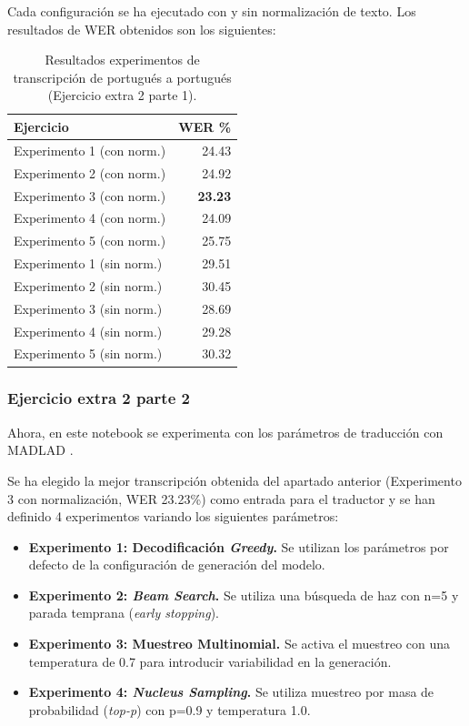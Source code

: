 \documentclass[11pt,spanish,listoffigures,listoftables]{tfgetsinf}
\begin{document}
Cada configuración se ha ejecutado con y sin normalización de texto. Los resultados de WER obtenidos son los siguientes:

\begin{table}[H]
\centering
\begin{tabular}{lr}
	\toprule
	\textbf{Ejercicio}  & \textbf{WER \%} \\
	\midrule
	Experimento 1 (con norm.) & 24.43 \\
	Experimento 2 (con norm.) & 24.92 \\
	Experimento 3 (con norm.) & \textbf{23.23} \\
	Experimento 4 (con norm.) & 24.09 \\
	Experimento 5 (con norm.) & 25.75 \\
	Experimento 1 (sin norm.) & 29.51 \\
	Experimento 2 (sin norm.) & 30.45 \\
	Experimento 3 (sin norm.) & 28.69 \\
	Experimento 4 (sin norm.) & 29.28 \\
	Experimento 5 (sin norm.) & 30.32 \\
	\bottomrule
\end{tabular}
\caption{Resultados experimentos de transcripción de portugués a portugués (Ejercicio extra 2 parte 1).}
\label{tab:wer_extra2_1}
\end{table}

\subsubsection{Ejercicio extra 2 parte 2}
Ahora, en este notebook se experimenta con los parámetros de traducción con MADLAD \cite{kudugunta2023madlad}.

Se ha elegido la mejor transcripción obtenida del apartado anterior (Experimento 3 con normalización, WER 23.23\%) como entrada para el traductor y se han definido 4 experimentos variando los siguientes parámetros:
\begin{itemize}
  \item \textbf{Experimento 1: Decodificación \textit{Greedy}.} Se utilizan los parámetros por defecto de la configuración de generación del modelo.
  \item \textbf{Experimento 2: \textit{Beam Search}.} Se utiliza una búsqueda de haz con n=5 y parada temprana (\textit{early stopping}).
  \item \textbf{Experimento 3: Muestreo Multinomial.} Se activa el muestreo con una temperatura de 0.7 para introducir variabilidad en la generación.
  \item \textbf{Experimento 4: \textit{Nucleus Sampling}.} Se utiliza muestreo por masa de probabilidad (\textit{top-p}) con p=0.9 y temperatura 1.0.
\end{itemize}
\end{document}
